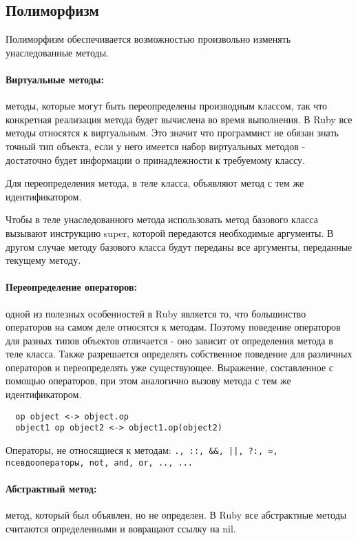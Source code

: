 \subsection{Полиморфизм}

Полиморфизм обеспечивается возможностью произвольно изменять унаследованные методы.

\paragraph*{Виртуальные методы:} методы, которые могут быть переопределены производным классом, так что конкретная реализация метода будет вычислена во время выполнения. В Ruby все методы относятся к виртуальным. Это значит что программист не обязан знать точный тип объекта, если у него имеется набор виртуальных методов - достаточно будет информации о принадлежности к требуемому классу.

Для переопределения метода, в теле класса, объявляют метод с тем же идентификатором. 

Чтобы в теле унаследованного метода использовать метод базового класса вызывают инструкцию super, которой передаются необходимые аргументы. В другом случае методу базового класса будут переданы все аргументы, переданные текущему методу.

\paragraph*{Переопределение операторов:} одной из полезных особенностей в Ruby является то, что большинство операторов на самом деле относятся к методам. Поэтому поведение операторов для разных типов объектов отличается - оно зависит от определения метода в теле класса. Также разрешается определять собственное поведение для различных операторов и переопределять уже существующее. Выражение, составленное с помощью операторов, при этом аналогично вызову метода с тем же идентификатором.
\begin{verbatim}
  op object <-> object.op
  object1 op object2 <-> object1.op(object2)
\end{verbatim}
Операторы, не относящиеся к методам:
\verb!., ::, &&, ||, ?:, =, псевдооператоры, not, and, or, .., ... !

\paragraph*{Абстрактный метод:} метод, который был объявлен, но не определен. В Ruby все абстрактные методы считаются определенными и вовращают ссылку на nil.

